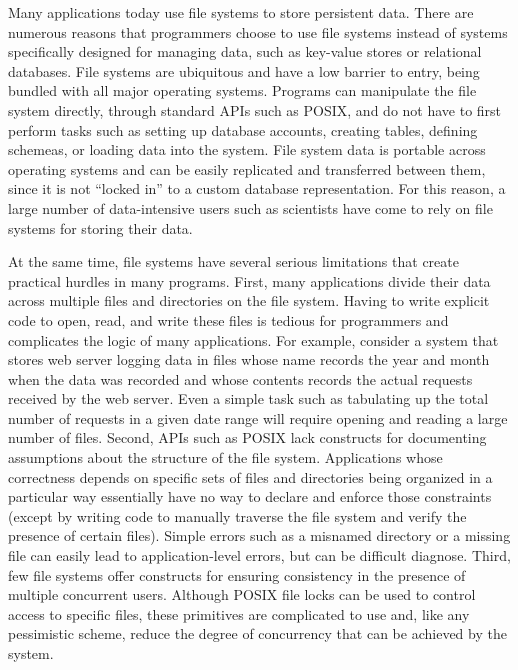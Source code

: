 %
%
Many applications today use file systems to store persistent
data. There are numerous reasons that programmers choose to use file
systems instead of systems specifically designed for managing data,
such as key-value stores or relational databases. File systems are
ubiquitous and have a low barrier to entry, being bundled with all
major operating systems. Programs can manipulate the file system
directly, through standard APIs such as POSIX, and do not have to
first perform tasks such as setting up database accounts, creating
tables, defining schemeas, or loading data into the system. File
system data is portable across operating systems and can be easily
replicated and transferred between them, since it is not ``locked in''
to a custom database representation. For this reason, a large number
of data-intensive users such as scientists have come to rely on file
systems for storing their data.

%
%
At the same time, file systems have several serious limitations that
create practical hurdles in many programs. First, many applications
divide their data across multiple files and directories on the file
system. Having to write explicit code to open, read, and write these
files is tedious for programmers and complicates the logic of many
applications. For example, consider a system that stores web server
logging data in files whose name records the year and month when the
data was recorded and whose contents records the actual requests
received by the web server. Even a simple task such as tabulating up
the total number of requests in a given date range will require
opening and reading a large number of files. Second, APIs such as
POSIX lack constructs for documenting assumptions about the structure
of the file system. Applications whose correctness depends on specific
sets of files and directories being organized in a particular way
essentially have no way to declare and enforce those constraints
(except by writing code to manually traverse the file system and
verify the presence of certain files). Simple errors such as a
misnamed directory or a missing file can easily lead to
application-level errors, but can be difficult diagnose. Third, few
file systems offer constructs for ensuring consistency in the presence
of multiple concurrent users. Although POSIX file locks can be used to
control access to specific files, these primitives are complicated to
use and, like any pessimistic scheme, reduce the degree of concurrency
that can be achieved by the system. 

